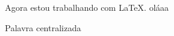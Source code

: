 \documentclass{article}
\begin{document}
Agora estou trabalhando com \LaTeX. oláaa


\centerline{Palavra centralizada}
\end{document}
